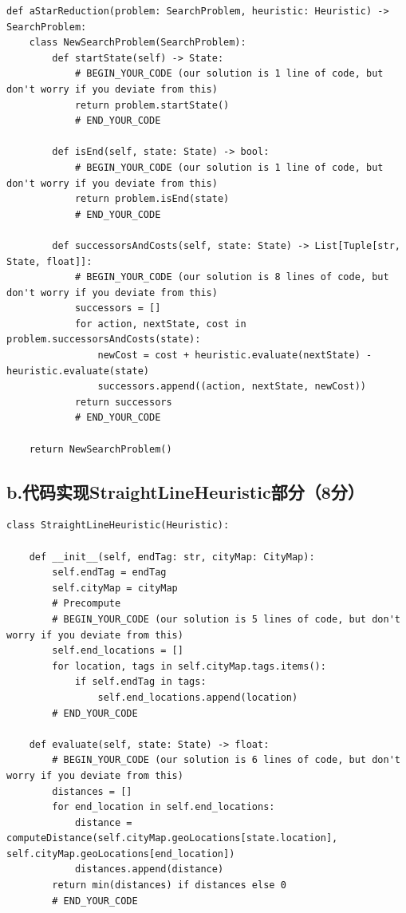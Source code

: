\documentclass{article}
\begin{document}
\begin{lstlisting}
def aStarReduction(problem: SearchProblem, heuristic: Heuristic) -> SearchProblem:
    class NewSearchProblem(SearchProblem):
        def startState(self) -> State:
            # BEGIN_YOUR_CODE (our solution is 1 line of code, but don't worry if you deviate from this)
            return problem.startState()
            # END_YOUR_CODE

        def isEnd(self, state: State) -> bool:
            # BEGIN_YOUR_CODE (our solution is 1 line of code, but don't worry if you deviate from this)
            return problem.isEnd(state)
            # END_YOUR_CODE

        def successorsAndCosts(self, state: State) -> List[Tuple[str, State, float]]:
            # BEGIN_YOUR_CODE (our solution is 8 lines of code, but don't worry if you deviate from this)
            successors = []
            for action, nextState, cost in problem.successorsAndCosts(state):
                newCost = cost + heuristic.evaluate(nextState) - heuristic.evaluate(state)
                successors.append((action, nextState, newCost))
            return successors
            # END_YOUR_CODE

    return NewSearchProblem()
\end{lstlisting}

\subsection*{b.代码实现StraightLineHeuristic部分（8分）}

\begin{lstlisting}
class StraightLineHeuristic(Heuristic):

    def __init__(self, endTag: str, cityMap: CityMap):
        self.endTag = endTag
        self.cityMap = cityMap
        # Precompute
        # BEGIN_YOUR_CODE (our solution is 5 lines of code, but don't worry if you deviate from this)
        self.end_locations = []
        for location, tags in self.cityMap.tags.items():
            if self.endTag in tags:
                self.end_locations.append(location)
        # END_YOUR_CODE

    def evaluate(self, state: State) -> float:
        # BEGIN_YOUR_CODE (our solution is 6 lines of code, but don't worry if you deviate from this)
        distances = []
        for end_location in self.end_locations:
            distance = computeDistance(self.cityMap.geoLocations[state.location], self.cityMap.geoLocations[end_location])
            distances.append(distance)
        return min(distances) if distances else 0
        # END_YOUR_CODE
\end{lstlisting}
\end{document}
